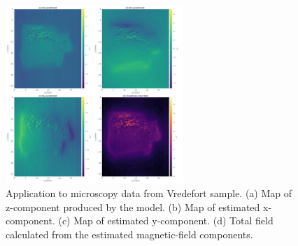 \begin{figure}[h!]
\centering
\includegraphics[width=0.6\textwidth]{vred/figs/field_components_eqlayer.png}
\caption{Application to microscopy data from Vredefort sample. (a) Map of z-component produced by the model. (b)  Map of estimated x-component. (c) Map of estimated y-component. (d) Total field calculated from the estimated magnetic-field components.}
\label{fig:total_field_components}
\end{figure}


 

